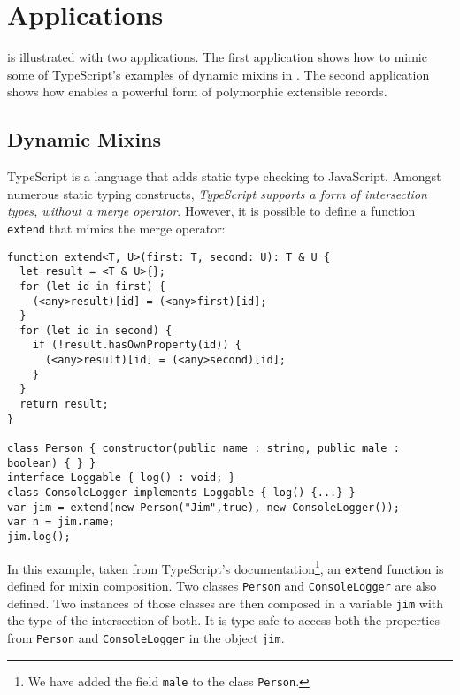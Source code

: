 \section{Applications}
\label{subsec:records}

\name is illustrated with two applications. The
first application shows how to mimic some of TypeScript's examples of 
dynamic mixins in \name. The second application shows how \name
enables a powerful form of polymorphic extensible records.

\subsection{Dynamic Mixins}\label{subsec:mixins}
TypeScript is a language that adds static type checking to JavaScript.
Amongst numerous static typing constructs, \emph{TypeScript supports a form of intersection types, 
without a merge operator}. 
However, it is possible to define a function \lstinline{extend}
that mimics the merge operator:

\begin{lstlisting}
function extend<T, U>(first: T, second: U): T & U {
  let result = <T & U>{};
  for (let id in first) {
    (<any>result)[id] = (<any>first)[id];
  }
  for (let id in second) {
    if (!result.hasOwnProperty(id)) {
      (<any>result)[id] = (<any>second)[id];
    }
  }
  return result;
}

class Person { constructor(public name : string, public male : boolean) { } }
interface Loggable { log() : void; }
class ConsoleLogger implements Loggable { log() {...} }
var jim = extend(new Person("Jim",true), new ConsoleLogger());
var n = jim.name;
jim.log();
\end{lstlisting}

In this example, taken from TypeScript's documentation\footnote{We have added the field \lstinline$male$ to the class
\lstinline$Person$.}, 
an \lstinline$extend$ function is defined 
for mixin composition. Two classes \lstinline$Person$ and
\lstinline$ConsoleLogger$ are also defined.
Two instances of those classes are then composed in a variable \lstinline$jim$ with the type of 
the intersection of both. It is type-safe to access both the properties
from \lstinline$Person$ and \lstinline$ConsoleLogger$ in the object \lstinline$jim$.

